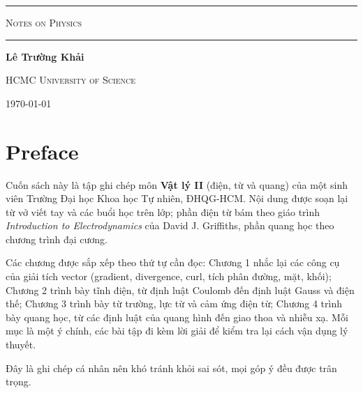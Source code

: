 \documentclass[12pt,oneside,openany]{book}
\begin{document}
\frontmatter



\begin{titlepage}
\thispagestyle{empty}
\begin{center}
\vspace*{2cm}

\rule{0.95\textwidth}{1.5pt}\par
\vspace{0.25cm}

{\LARGE\scshape Notes on Physics \par}

\vspace{0.25cm}
\rule{0.95\textwidth}{1.5pt}\par

\vspace{2.2cm}

{\large\bfseries Lê Trường Khải\par}
\vspace{0.3cm}
\scshape HCMC University of Science\par

\vspace{1.8cm}
\textsc{\today}\par

\end{center}
\end{titlepage}

\tableofcontents


\chapter*{Preface}
Cuốn sách này là tập ghi chép môn \textbf{Vật lý II} (điện, từ và quang) của một sinh viên Trường Đại học Khoa học Tự nhiên, ĐHQG-HCM. Nội dung được soạn lại từ vở viết tay và các buổi học trên lớp; phần điện từ bám theo giáo trình \textit{Introduction to Electrodynamics} của David J. Griffiths, phần quang học theo chương trình đại cương.

Các chương được sắp xếp theo thứ tự cần đọc: Chương 1 nhắc lại các công cụ của giải tích vector (gradient, divergence, curl, tích phân đường, mặt, khối); Chương 2 trình bày tĩnh điện, từ định luật Coulomb đến định luật Gauss và điện thế; Chương 3 trình bày từ trường, lực từ và cảm ứng điện từ; Chương 4 trình bày quang học, từ các định luật của quang hình đến giao thoa và nhiễu xạ. Mỗi mục là một ý chính, các bài tập đi kèm lời giải để kiểm tra lại cách vận dụng lý thuyết.

Đây là ghi chép cá nhân nên khó tránh khỏi sai sót, mọi góp ý đều được trân trọng.

\mainmatter





\end{document}
